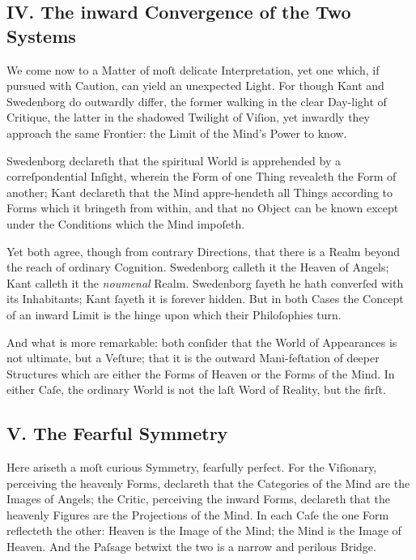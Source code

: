 \documentclass[12pt]{article}
\begin{document}
\subsection*{IV. The inward Convergence of the Two Systems}

We come now to a Matter of moſt delicate Interpretation, yet one which, if 
pursued with Caution, can yield an unexpected Light. For though Kant and 
Swedenborg do outwardly differ, the former walking in the clear Day-light of 
Critique, the latter in the shadowed Twilight of Viſion, yet inwardly they 
approach the same Frontier: the Limit of the Mind’s Power to know.

Swedenborg declareth that the spiritual World is apprehended by a 
correſpondential Inſight, wherein the Form of one Thing revealeth the Form of 
another; Kant declareth that the Mind appre-hendeth all Things according to 
Forms which it bringeth from within, and that no Object can be known except 
under the Conditions which the Mind impoſeth.

Yet both agree, though from contrary Directions, that there is a Realm beyond
the reach of ordinary Cognition. Swedenborg calleth it the Heaven of Angels; 
Kant calleth it the \textit{noumenal} Realm. Swedenborg ſayeth he hath 
converſed with its Inhabitants; Kant ſayeth it is forever hidden. But in both 
Cases the Concept of an inward Limit is the hinge upon which their 
Philoſophies turn.

And what is more remarkable: both conſider that the World of Appearances is 
not ultimate, but a Veſture; that it is the outward Mani-feſtation of deeper 
Structures which are either the Forms of Heaven or the Forms of the Mind. In 
either Caſe, the ordinary World is not the laſt Word of Reality, but the 
firſt.

\subsection*{V. The Fearful Symmetry}

Here ariseth a moſt curious Symmetry, fearfully perfect. For the Viſionary, 
perceiving the heavenly Forms, declareth that the Categories of the Mind are 
the Images of Angels; the Critic, perceiving the inward Forms, declareth that 
the heavenly Figures are the Projections of the Mind. In each Caſe the one 
Form reflecteth the other: Heaven is the Image of the Mind; the Mind is the 
Image of Heaven. And the Paſsage betwixt the two is a narrow and perilous 
Bridge.
\end{document}
